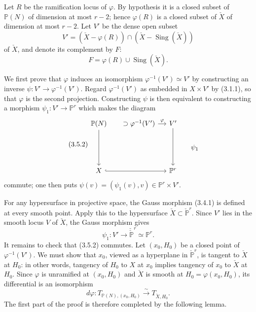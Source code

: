 Let $R$ be the ramification locus of $\varphi$.  By hypothesis it is
a closed subset of $\mathbb P(N)$ of dimension at most $r-2$; hence
$\varphi(R)$ is a closed subset of $\check X$ of dimension at most
$r-2$.  Let $V'$ be the dense open subset
\begin{equation}\tag{3.5.1}
V'=(\check X-\varphi(R))\cap
   (\check X-\operatorname{Sing}(\check X))
\end{equation}
of $\check X$, and denote its complement by $F$:
\begin{equation}\tag{3.5.1.1}
F=\varphi(R)\cup\operatorname{Sing}(\check X).
\end{equation}

We first prove that $\varphi$ induces an isomorphism
$\varphi^{-1}(V')\simeq V'$ by constructing an inverse
$\psi:V'\to\varphi^{-1}(V')$.  Regard $\varphi^{-1}(V')$ as embedded
in $X\times V'$ by (3.1.1), so that $\varphi$ is the second
projection.  Constructing $\psi$ is then equivalent to constructing a
morphism $\psi_1:V'\to\mathbb P^r$ which makes the diagram
\begin{equation}\tag{3.5.2}
\begin{tikzcd}[column sep=small]
\mathbb P(N) \arrow[dd]
  & {}\supset\varphi^{-1}(V') \arrow[r,"\varphi"]
  & V' \arrow[dd] & \\
  & & & \psi_1 \\
X \arrow[rr,hook] & & \mathbb P^r &
\end{tikzcd}
\end{equation}
commute; one then puts
$\psi(v)=(\psi_1(v),v)\in\mathbb P^r\times V'$.

For any hypersurface in projective space, the Gauss morphism (3.4.1)
is defined at every smooth point.  Apply this to the hypersurface
$\check X\subset\check{\mathbb P}^{r}$.  Since $V'$ lies in the
smooth locus $V$ of $\check X$, the Gauss morphism gives
\begin{equation}\tag{3.5.3}
\psi_1:V'\longrightarrow
\check{\check{\mathbb P}}^{r}\simeq\mathbb P^r.
\end{equation}
It remains to check that (3.5.2) commutes.  Let $(x_0,H_0)$ be a
closed point of $\varphi^{-1}(V')$.  We must show that $x_0$, viewed
as a hyperplane in $\check{\mathbb P}^{r}$, is tangent to $\check X$
at $H_0$: in other words, tangency of $H_0$ to $X$ at $x_0$ implies
tangency of $x_0$ to $\check X$ at $H_0$.  Since $\varphi$ is
unramified at $(x_0,H_0)$ and $\check X$ is smooth at
$H_0=\varphi(x_0,H_0)$, its differential is an isomorphism
\begin{equation}\tag{3.5.4}
d\varphi:
T_{\mathbb P(N),(x_0,H_0)}\xrightarrow{\sim}T_{\check X,H_0}.
\end{equation}
The first part of the proof is therefore completed by the following
lemma.
